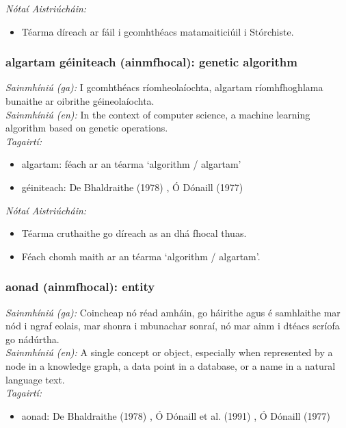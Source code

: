 \documentclass{article}
\begin{document}
 \noindent \textit{Nótaí Aistriúcháin:}
\begin{itemize}
	\item Téarma díreach ar fáil i gcomhthéacs matamaiticiúil i Stórchiste.
\end{itemize}


\subsubsection*{algartam géiniteach (ainmfhocal): genetic algorithm}
 \noindent \textit{Sainmhíniú (ga):} I gcomhthéacs ríomheolaíochta, algartam ríomhfhoghlama bunaithe ar oibrithe géineolaíochta.
\\
 \noindent \textit{Sainmhíniú (en):} In the context of computer science, a machine learning algorithm based on genetic operations.
\\
 \noindent \textit{Tagairtí:}
\begin{itemize}
	\item algartam: féach ar an téarma `algorithm / algartam'
	\item géiniteach: De Bhaldraithe (1978) \cite{de-bhaldraithe}, Ó Dónaill (1977) \cite{odonaill}
\end{itemize}

 \noindent \textit{Nótaí Aistriúcháin:}
\begin{itemize}
	\item Téarma cruthaithe go díreach as an dhá fhocal thuas.
	\item Féach chomh maith ar an téarma `algorithm / algartam'.
\end{itemize}


\subsubsection*{aonad (ainmfhocal): entity}
 \noindent \textit{Sainmhíniú (ga):} Coincheap nó réad amháin, go háirithe agus é samhlaithe mar nód i ngraf eolais, mar shonra i mbunachar sonraí, nó mar ainm i dtéacs scríofa go nádúrtha.
\\
 \noindent \textit{Sainmhíniú (en):} A single concept or object, especially when represented by a node in a knowledge graph, a data point in a database, or a name in a natural language text.
\\
 \noindent \textit{Tagairtí:}
\begin{itemize}
	\item aonad: De Bhaldraithe (1978) \cite{de-bhaldraithe}, Ó Dónaill et al. (1991) \cite{focloir-beag}, Ó Dónaill (1977) \cite{odonaill}
\end{itemize}
\end{document}
